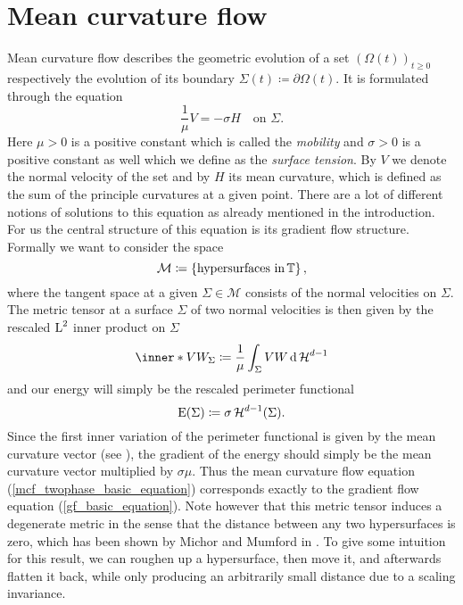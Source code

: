 \section{Mean curvature flow}
	\label{section_mcf}

Mean curvature flow describes the geometric evolution of a set $ ( \Omega ( t ) 
)_{ t \geq 0 } $ respectively the evolution of its boundary $ \Sigma ( t ) 
\coloneqq \partial \Omega ( t ) $. It is formulated through the equation
\begin{equation}
	\label{mcf_twophase_basic_equation}
	\frac{ 1 }{ \mu } V = - \sigma H 
	\quad
	\text{on }
	\Sigma.
\end{equation}
Here $ \mu > 0 $ is a positive constant which is called the \emph{mobility} and 
$ \sigma > 0 $ is a positive constant as well which we define as the 
\emph{surface tension}. By $ V $ we denote the normal velocity of the set and 
by $ H $ its mean curvature, which is defined as the sum of the principle 
curvatures at a given point.
There are a lot of different notions of solutions to this equation as already 
mentioned in the introduction.
For us the central structure of this equation is its gradient flow structure. Formally we want to consider the space
\begin{equation*}
	\mathcal{ M }
	\coloneqq
	\left\{
		\text{hypersurfaces in} \operatorname{\mathbb{T}}
	\right\},
\end{equation*}
where the tangent space at a given $ \Sigma \in \mathcal{ M } $ consists of the normal velocities on $ \Sigma $.
The metric tensor at a surface $ \Sigma $ of two normal velocities is then 
given by the rescaled $ \operatorname{L}^{ 2 } $ inner product on $ \Sigma $
\begin{equation*}
	\inner*{ V }{ W }_{ \Sigma }
	\coloneqq
	\frac{ 1 }{ \mu }
	\int_{ \Sigma }
		V W
	\dd{ \hm^{ d - 1 } }
\end{equation*}
and our energy will simply be the rescaled perimeter functional
\begin{equation*}
	\operatorname{E} ( \Sigma )
	\coloneqq
	\sigma \operatorname{\mathcal{H}}^{ d -1 } ( \Sigma ).
\end{equation*}
Since the first inner variation of the perimeter functional is given by the mean curvature vector (see \cite[Thm.~17.5]{maggi_sets_of_finite_perimeter}), the gradient of the energy should simply be the mean curvature vector multiplied by $ \sigma \mu $.
Thus the mean curvature flow equation (\ref{mcf_twophase_basic_equation}) 
corresponds exactly to the gradient flow equation (\ref{gf_basic_equation}).
Note however that this metric tensor induces a degenerate metric in the sense 
that the distance between any two hypersurfaces is zero, which has been shown 
by Michor and Mumford 
in \cite{michor_mumford_riemannian_geometries_on_spaces_of_plane_curves}. 
To give some intuition for this result, we can roughen up a hypersurface, then 
move it, and 
afterwards flatten 
it back, while only producing an arbitrarily small distance due to a scaling 
invariance.

